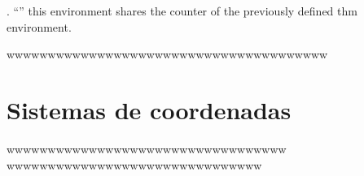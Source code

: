 \documentclass[a4paper]{report}
\begin{document}
															\cite{hilbert2020geometry}. ``''  this environment shares the counter of the previously defined thm environment.
															\cite{reyes} \cite{www}


															wwwwwwwwwwwwwwwwwwwwwwwwwwwwwwwwwwwwwww





															
															
															\printindex


															\appendix
															\setcounter{page}{1}
															\chapter{Sistemas de coordenadas}
															wwwwwwwwwwwwwwwwwwwwwwwwwwwwwwwwww
															wwwwwwwwwwwwwwwwwwwwwwwwwwwwwww
															
\end{document}
